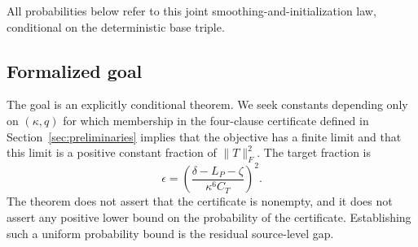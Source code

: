 All probabilities below refer to this joint smoothing-and-initialization law,
conditional on the deterministic base triple.

\subsection{Formalized goal}

The goal is an explicitly conditional theorem.  We seek constants depending
only on $(\kappa,q)$ for which membership in the four-clause certificate
defined in Section~\ref{sec:preliminaries} implies that the objective has a
finite limit and that this limit is a positive constant fraction of
$\|T\|_F^2$.  The target fraction is
\[
\epsilon=
\left(\frac{\delta-L_P-\zeta}{\kappa^6C_T}\right)^2.
\]
The theorem does not assert that the certificate is nonempty, and it does not
assert any positive lower bound on the probability of the certificate.
Establishing such a uniform probability bound is the residual source-level
gap.
